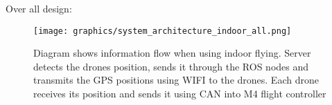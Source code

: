 Over all design:
\begin{figure}[H]
    \center
    \texttt{[image: graphics/system\_architecture\_indoor\_all.png]}
    \caption{Diagram shows information flow when using indoor flying. Server detects the drones position, sends it through the ROS nodes and transmits the GPS positions using WIFI to the drones. Each drone receives its position and sends it using CAN into M4 flight controller}
    \label{fig:PCB_block}
\end{figure}

